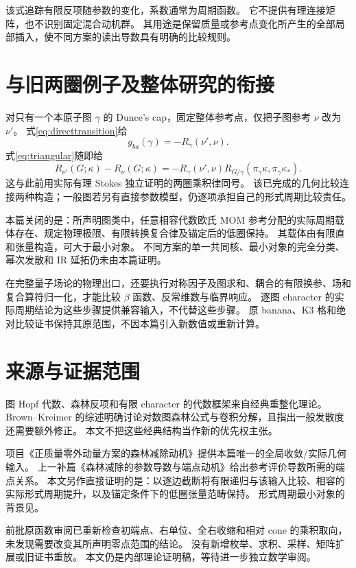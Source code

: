 \documentclass[11pt,a4paper]{ctexart}
\theoremstyle{cnplain}
\theoremstyle{remark}\newtheorem{remark}[theorem]{注}
\begin{document}
该式追踪有限反项随参数的变化，系数通常为周期函数。
它不提供有理连接矩阵，也不识别固定混合动机群。
其用途是保留质量或参考点变化所产生的全部局部插入，使不同方案的读出导数具有明确的比较规则。

\section{与旧两圈例子及整体研究的衔接}
对只有一个本原子图 $\gamma$ 的 Dunce's cap，固定整体参考点，仅把子图参考 $\nu$ 改为 $\nu'$。
式\eqref{eq:directtransition}给
\[
 g_{ba}(\gamma)=-R_\gamma(\nu',\nu).
\]
式\eqref{eq:triangular}随即给
\begin{equation}\label{eq:dunce}
 R_{\nu'}(G;\kappa)-R_\nu(G;\kappa)
     =-R_\gamma(\nu',\nu)R_{G/\gamma}(\pi_\gamma\kappa,
                                                    \pi_\gamma\kappa_*).
\end{equation}
这与此前用实际有理 Stokes 独立证明的两圈乘积律同号。
该已完成的几何比较连接两种构造；一般图若另有直接参数模型，仍逐项承担自己的形式周期比较责任。

本篇关闭的是：所声明图类中，任意相容代数欧氏 MOM 参考分配的实际周期载体存在、规定物理极限、有限转换复合律及锚定后的低圈保持。
其载体由有限直和张量构造，可大于最小对象。
不同方案的单一共同核、最小对象的完全分类、幂次发散和 IR 延拓仍未由本篇证明。

在完整量子场论的物理出口，还要执行对称因子及图求和、耦合的有限换参、场和复合算符归一化，才能比较 $\beta$ 函数、反常维数与临界响应。
逐图 character 的实际周期结论为这些步骤提供兼容输入，不代替这些步骤。
原 banana、K3 格和绝对比较证书保持其原范围，不因本篇引入新数值或重新计算。

\section*{来源与证据范围}
图 Hopf 代数、森林反项和有限 character 的代数框架来自经典重整化理论\cite{ck,bk}。
Brown--Kreimer 的综述\cite[\S\,3.2--4]{bk}明确讨论对数图森林公式与卷积分解，且指出一般发散度还需要额外修正。
本文不把这些经典结构当作新的优先权主张。

项目《正质量零外动量方案的森林减除动机》提供本篇唯一的全局收敛/实际几何输入。
上一补篇《森林减除的参数导数与端点动机》给出参考评价导数所需的端点关系。
本文另作直接证明的是：以逐边截断将有限递归与该输入比较、相容的实际形式周期提升，以及锚定条件下的低圈张量范畴保持。
形式周期最小对象的背景见\cite{brown}。

前批原函数审阅已重新检查初端点、右单位、全右收缩和相对 cone 的乘积取向，未发现需要改变其所声明零点范围的结论。
没有新增枚举、求积、采样、矩阵扩展或旧证书重放。
本文仍是内部理论证明稿，等待进一步独立数学审阅。
\end{document}
